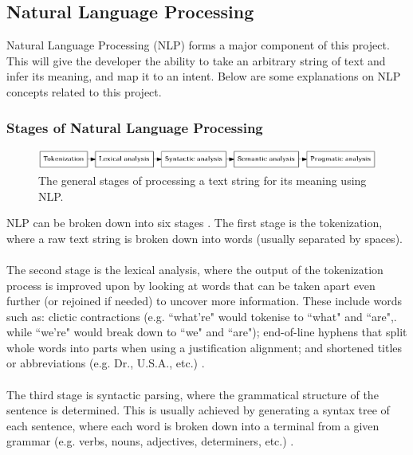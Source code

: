 \documentclass[11pt]{article}
\begin{document}
\subsection{Natural Language Processing}

Natural Language Processing (NLP) forms a major component of this project. This will give the developer the ability to take an arbitrary string of text and infer its meaning, and map it to an intent. Below are some explanations on NLP concepts related to this project.

\subsubsection{Stages of Natural Language Processing}

\begin{center}
\begin{figure}[H]
  \includegraphics[width=\textwidth]{nlp-stages.png}
  \caption{The general stages of processing a text string for its meaning using NLP.}
\end{figure}
\end{center}

NLP can be broken down into six stages \cite{RefWorks:38}. The first stage is the tokenization, where a raw text string is broken down into words (usually separated by spaces).
\\
\\
The second stage is the lexical analysis, where the output of the tokenization process is improved upon by looking at words that can be taken apart even further (or rejoined if needed) to uncover more information. These include words such as: clictic contractions (e.g. ``what're" would tokenise to ``what" and ``are",. while ``we're" would break down to ``we" and ``are"); end-of-line hyphens that split whole words into parts when using a justification alignment; and shortened titles or abbreviations (e.g. Dr., U.S.A., etc.) \cite{RefWorks:39}.
\\
\\
The third stage is syntactic parsing, where the grammatical structure of the sentence is determined. This is usually achieved by generating a syntax tree of each sentence, where each word is broken down into a terminal from a given grammar (e.g. verbs, nouns, adjectives, determiners, etc.) \cite{RefWorks:40}.
\end{document}

